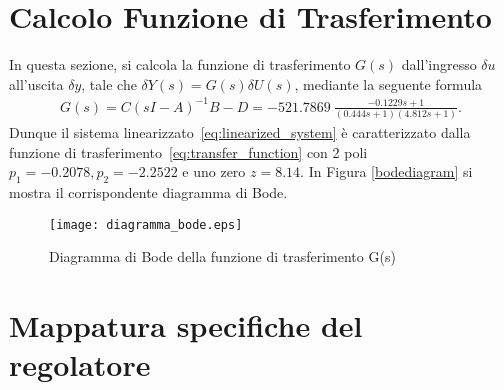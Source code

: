 \documentclass[a4paper, 11pt]{article}
\begin{document}
\clearpage
\section{Calcolo Funzione di Trasferimento}

In questa sezione, si calcola la funzione di trasferimento $G(s)$ dall'ingresso $\delta u$ all'uscita $\delta y$, tale che $\delta Y(s) = G(s)\delta U(s)$,   mediante la seguente formula 
%
%
\begin{align}\label{eq:transfer_function}
G(s) = C(sI-A)^{-1}B-D = -521.7869\ \frac{-0.1229s+1}{(0.444s+1)(4.812s+1)}.
\end{align}
%
Dunque il sistema linearizzato~\eqref{eq:linearized_system} è caratterizzato dalla funzione di trasferimento~\eqref{eq:transfer_function} con 2 poli \\ $p_1 = -0.2078,  p_2=-2.2522$ e uno zero $z = 8.14$. In Figura \eqref{bodediagram} si mostra il corrispondente diagramma di Bode. 

\begin{figure}[h!]
    \centering
    \texttt{[image: diagramma\_bode.eps]}
    \caption{Diagramma di Bode della funzione di trasferimento G(s)}
    \label{bodediagram}
\end{figure}

\clearpage
\section{Mappatura specifiche del regolatore}
\label{sec:specifications}
\end{document}
